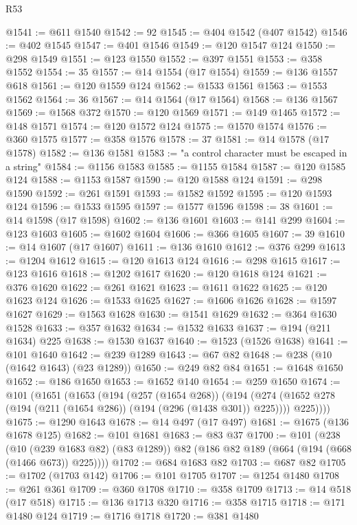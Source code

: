 \begin{lexlean}{R53}
\begin{coremodule}
@1541 := @611 @1540
@1542 := 92
@1545 := @404 @1542 (@407 @1542)
@1546 := @402 @1545
@1547 := @401 @1546
@1549 := @120 @1547 @124
@1550 := @298 @1549
@1551 := @123 @1550
@1552 := @397 @1551
@1553 := @358 @1552
@1554 := 35
@1557 := @14 @1554 (@17 @1554)
@1559 := @136 @1557 @618
@1561 := @120 @1559 @124
@1562 := @1533 @1561
@1563 := @1553 @1562
@1564 := 36
@1567 := @14 @1564 (@17 @1564)
@1568 := @136 @1567
@1569 := @1568 @372
@1570 := @120 @1569
@1571 := @149 @1465
@1572 := @148 @1571
@1574 := @120 @1572 @124
@1575 := @1570 @1574
@1576 := @360 @1575
@1577 := @358 @1576
@1578 := 37
@1581 := @14 @1578 (@17 @1578)
@1582 := @136 @1581
@1583 := "a control character must be escaped in a string"
@1584 := @1156 @1583
@1585 := @1155 @1584
@1587 := @120 @1585 @124
@1588 := @1153 @1587
@1590 := @120 @1588 @124
@1591 := @298 @1590
@1592 := @261 @1591
@1593 := @1582 @1592
@1595 := @120 @1593 @124
@1596 := @1533 @1595
@1597 := @1577 @1596
@1598 := 38
@1601 := @14 @1598 (@17 @1598)
@1602 := @136 @1601
@1603 := @141 @299
@1604 := @123 @1603
@1605 := @1602 @1604
@1606 := @366 @1605
@1607 := 39
@1610 := @14 @1607 (@17 @1607)
@1611 := @136 @1610
@1612 := @376 @299
@1613 := @1204 @1612
@1615 := @120 @1613 @124
@1616 := @298 @1615
@1617 := @123 @1616
@1618 := @1202 @1617
@1620 := @120 @1618 @124
@1621 := @376 @1620
@1622 := @261 @1621
@1623 := @1611 @1622
@1625 := @120 @1623 @124
@1626 := @1533 @1625
@1627 := @1606 @1626
@1628 := @1597 @1627
@1629 := @1563 @1628
@1630 := @1541 @1629
@1632 := @364 @1630 @1528
@1633 := @357 @1632
@1634 := @1532 @1633
@1637 := @194 (@211 @1634) @225
@1638 := @1530 @1637
@1640 := @1523 (@1526 @1638)
@1641 := @101 @1640
@1642 := @239 @1289
@1643 := @67 @82
@1648 := @238 (@10 (@1642 @1643) (@23 @1289))
@1650 := @249 @82 @84
@1651 := @1648 @1650
@1652 := @186 @1650
@1653 := @1652 @140
@1654 := @259 @1650
@1674 := @101
    (@1651
      (@1653
        (@194
          (@257 (@1654 @268))
          (@194
            (@274 (@1652 @278 (@194 (@211 (@1654 @286)) (@194 (@296 (@1438 @301)) @225))))
            @225))))
@1675 := @1290 @1643
@1678 := @14 @497 (@17 @497)
@1681 := @1675 (@136 @1678 @125)
@1682 := @101 @1681
@1683 := @83 @37
@1700 := @101
    (@238
      (@10 (@239 @1683 @82) (@83 @1289))
      @82
      (@186 @82 @189 (@664 (@194 (@668 (@1466 @673)) @225))))
@1702 := @684 @1683 @82
@1703 := @687 @82
@1705 := @1702 (@1703 @142)
@1706 := @101 @1705
@1707 := @1254 @1480
@1708 := @261 @361
@1709 := @360 @1708
@1710 := @358 @1709
@1713 := @14 @518 (@17 @518)
@1715 := @136 @1713 @320
@1716 := @358 @1715
@1718 := @171 @1480 @124
@1719 := @1716 @1718
@1720 := @381 @1480

\end{coremodule}
\end{lexlean}
